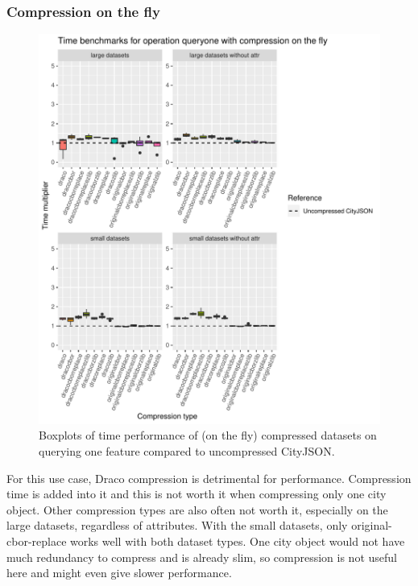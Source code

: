 \subsubsection{Compression on the fly}

\begin{figure}[h!]
    \includegraphics[scale=0.92]{figs/benchmark/individualotf/queryone.pdf}
    \caption{Boxplots of time performance of (on the fly) compressed datasets on querying one feature compared to uncompressed CityJSON.}
    \label{figotf:sdvis}
\end{figure}

For this use case, Draco compression is detrimental for performance.
Compression time is added into it and this is not worth it when compressing only one city object.
Other compression types are also often not worth it, especially on the large datasets, regardless of attributes.
With the small datasets, only original-cbor-replace works well with both dataset types.
One city object would not have much redundancy to compress and is already slim, so compression is not useful here and might even give slower performance.

